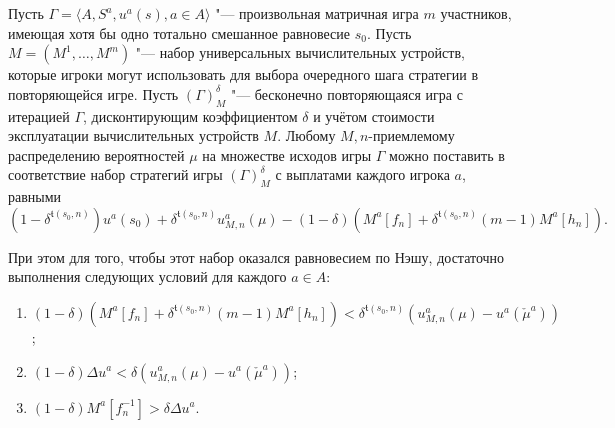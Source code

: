 \begin{theorem}
	Пусть $\Gamma = \langle A, S^a, u^a(s), a \in A \rangle$ "--- произвольная матричная игра $m$ участников, имеющая хотя бы одно тотально смешанное равновесие $s_0$. Пусть $M = (M^1, \ldots, M^m)$ "--- набор универсальных вычислительных устройств, которые игроки могут использовать для выбора очередного шага стратегии в повторяющейся игре. Пусть $(\Gamma)_M^{\delta}$ "--- бесконечно повторяющаяся игра с итерацией $\Gamma$, дисконтирующим коэффициентом $\delta$ и учётом стоимости эксплуатации вычислительных устройств $M$. Любому $M,n$-приемлемому распределению вероятностей $\mu$ на множестве исходов игры $\Gamma$ можно поставить в соответствие набор стратегий игры $(\Gamma)_M^{\delta}$ с выплатами каждого игрока $a$, равными %
	\begin{equation*}
		(1 - \delta^{\mathfrak{t}(s_0, n)}) u^a(s_0) + \delta^{\mathfrak{t}(s_0, n)} u_{M,n}^a(\mu) - (1 - \delta) (M^a[f_n] + \delta^{\mathfrak{t}(s_0, n)} (m - 1) M^a[h_n]).
	\end{equation*}
	
	При этом для того, чтобы этот набор оказался равновесием по Нэшу, достаточно выполнения следующих условий для каждого $a \in A$:
	\begin{enumerate}
		\item $(1 - \delta) (M^a[f_n] + \delta^{\mathfrak{t}(s_0, n)} (m - 1) M^a[h_n]) < \delta^{\mathfrak{t}(s_0, n)}(u_{M,n}^a(\mu) - u^a(\check{\mu}^a))$;
		\item $(1 - \delta) \Delta u^a < \delta (u_{M,n}^a(\mu) - u^a(\check{\mu}^a))$;
		\item $(1 - \delta) M^a[f_n^{-1}] > \delta \Delta u^a$.
	\end{enumerate}
%
\end{theorem}

